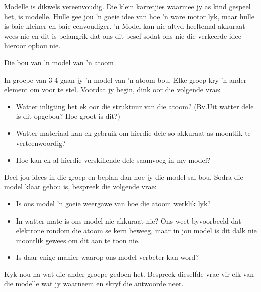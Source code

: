         \label{m38741*id260480}Modelle is dikwels vereenvoudig. Die klein karretjies waarmee jy as kind gespeel het, is modelle. Hulle gee jou  'n goeie idee van hoe  'n ware motor lyk, maar hulle is baie kleiner en baie eenvoudiger.  'n Model kan nie altyd heeltemal akkuraat wees nie en dit is belangrik dat ons dit besef sodat ons nie die verkeerde idee hieroor opbou nie.\par 
\begin{groupdiscussion}{Die bou van  'n model van 'n atoom}
            \nopagebreak
\begin{multicols}{2}
        \label{m38741*id260488}In groepe van 3-4 gaan jy  'n model van 'n atoom bou. Elke groep kry 'n ander element om voor te stel. Voordat jy begin, dink oor die volgende vrae:\par 
        \label{m38741*id260495}\begin{itemize}[noitemsep]
            \label{m38741*uid114}\item Watter inligting het ek oor die struktuur van die atoom? (Bv.Uit watter dele is dit opgebou? Hoe groot is dit?)
\label{m38741*uid115}\item Watter materiaal kan ek gebruik om hierdie dele so akkuraat as moontlik te verteenwoordig?
\label{m38741*uid116}\item Hoe kan ek al hierdie verskillende dele saamvoeg in my model?
\end{itemize}
        \label{m38741*id260537}Deel jou idees in die groep en beplan dan hoe jy die model sal bou. Sodra die model klaar gebou is, bespreek die volgende vrae:\par 
        \label{m38741*id260542}\begin{itemize}[noitemsep]
            \label{m38741*uid117}\item Is ons model  'n goeie weergawe van hoe die atoom werklik lyk?
\label{m38741*uid118}\item In watter mate is ons model nie akkuraat nie? Ons weet byvoorbeeld dat elektrone rondom die atoom se kern beweeg, maar in jou model is dit dalk nie moontlik gewees om dit aan te toon nie.
\label{m38741*uid119}\item Is daar enige manier waarop ons model verbeter kan word?
\end{itemize}
        \label{m38741*id260596}Kyk nou na wat die ander groepe gedoen het. Bespreek dieselfde vrae vir elk van die modelle wat jy waarneem en skryf die antwoorde neer. \par 

\end{multicols}
\end{groupdiscussion}
